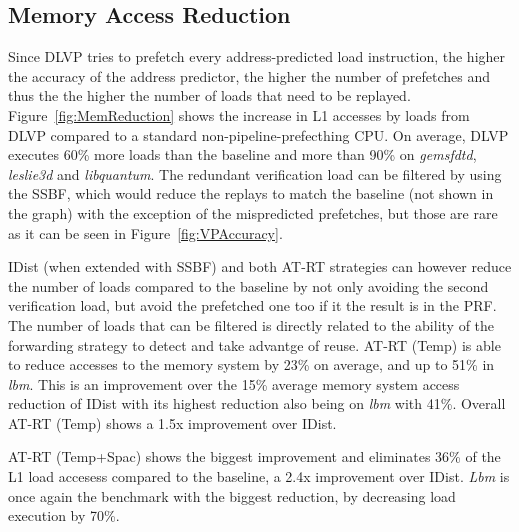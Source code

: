 \documentclass{sig-alternate}
\begin{document}
\subsection{Memory Access Reduction}
Since DLVP tries to prefetch every address-predicted load instruction, the higher the accuracy of the address predictor, the higher the number of prefetches and thus the the higher the number of loads that need to be replayed. Figure~\ref{fig:MemReduction} shows the increase in L1 accesses by loads from DLVP compared to a standard non-pipeline-prefecthing CPU. On average, DLVP executes 60\% more loads than the baseline and more than 90\% on \textit{gemsfdtd}, \textit{leslie3d} and \textit{libquantum}. The redundant verification load can be filtered by using the SSBF, which would reduce the replays to match the baseline (not shown in the graph) with the exception of the mispredicted prefetches, but those are rare as it can be seen in Figure~\ref{fig:VPAccuracy}.


IDist (when extended with SSBF) and both AT-RT strategies can however reduce the number of loads compared to the baseline by not only avoiding the second verification load, but avoid the prefetched one too if it the result is in the PRF. The number of loads that can be filtered is directly related to the ability of the forwarding strategy to detect and take advantge of reuse. AT-RT (Temp) is able to reduce accesses to the memory system by 23\% on average, and up to 51\% in \textit{lbm}. This is an improvement over the 15\% average memory system access reduction of IDist with its highest reduction also being on \textit{lbm} with 41\%. Overall AT-RT (Temp) shows a 1.5x improvement over IDist.

AT-RT (Temp+Spac) shows the biggest improvement and eliminates 36\% of the L1 load accesess compared to the baseline, a 2.4x improvement over IDist. \textit{Lbm} is once again the benchmark with the biggest reduction, by decreasing load execution by 70\%. 
\end{document}
